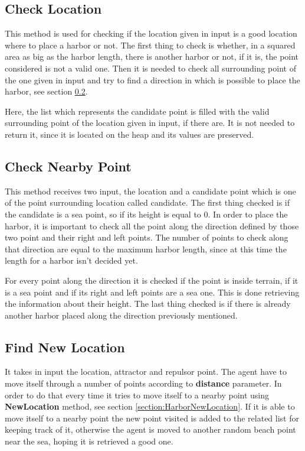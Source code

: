 \documentclass[12pt]{article}
\begin{document}
    \subsection{Check Location} \label{harbor:checkLocation}
    This method is used for checking if the location given in input is a good location where to place a harbor or not. The first thing to check is whether, in a squared area
    as big as the harbor length, there is another harbor or not, if it is, the point considered is not a valid one. Then it is needed to check all surrounding point of the 
    one given in input and try to find a direction in which is possible to place the harbor, see section \ref{section:harborNearby}.

    Here, the list which represents the candidate point is filled with the valid surrounding point of the location given in input, if there are. It is not needed to return it,
    since it is located on the heap and its values are preserved. 
    
    \subsection{Check Nearby Point} \label{section:harborNearby}
    This method receives two input, the location and a candidate point which is one of the point surrounding location called candidate. The first thing checked is
    if the candidate is a sea point, so if its height is equal to 0. In order to place the harbor, it is important to check all the point along the direction defined by those
    two point and their right and left points. The number of points to check along that direction are equal to the maximum harbor length, since at this time the length for 
    a harbor isn't decided yet.

    For every point along the direction it is checked if the point is inside terrain, if it is a sea point and if its right and left points are a sea one. This is done
    retrieving the information about their height. The last thing checked is if there is already another harbor placed along the direction previously mentioned.

    \subsection{Find New Location} \label{section:harborNew}
    It takes in input the location, attractor and repulsor point. The agent have to move itself through a number of points according to \textbf{distance} parameter. In order
    to do that every time it tries to move itself to a nearby point using \textbf{NewLocation} method, see section \ref{section:HarborNewLocation}. If it is able to move itself to a
    nearby point the new point visited is added to the related list for keeping track of it, otherwise the agent is moved to another random beach point near the sea, hoping
    it is retrieved a good one.
\end{document}

